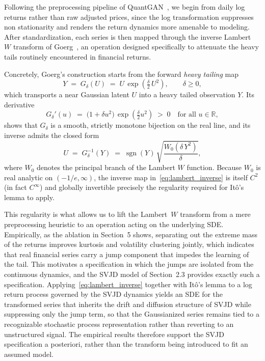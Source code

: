 \documentclass[sigconf,natbib=false]{acmart}
\begin{document}
Following the preprocessing pipeline of QuantGAN~\cite{QuantGAN}, we begin from daily log returns rather than raw adjusted prices, since the log transformation suppresses non stationarity and renders the return dynamics more amenable to modeling. After standardization, each series is then mapped through the inverse Lambert~$W$ transform of Goerg~\cite{goerg2015lambert}, an operation designed specifically to attenuate the heavy tails routinely encountered in financial returns.

Concretely, Goerg's construction starts from the forward \emph{heavy tailing} map
\begin{equation}
    Y \;=\; G_{\delta}(U) \;=\; U \, \exp\!\left( \tfrac{\delta}{2}\, U^{2} \right), \qquad \delta \geq 0,
    \label{eq:lambert_forward}
\end{equation}
which transports a near Gaussian latent $U$ into a heavy tailed observation $Y$. Its derivative
\begin{equation}
    G_{\delta}'(u) \;=\; \bigl(1 + \delta u^{2}\bigr)\, \exp\!\left( \tfrac{\delta}{2} u^{2} \right) \;>\; 0
    \quad \text{for all } u \in \mathbb{R},
\end{equation}
shows that $G_{\delta}$ is a smooth, strictly monotone bijection on the real line, and its inverse admits the closed form
\begin{equation}
    U \;=\; G_{\delta}^{-1}(Y) \;=\; \operatorname{sgn}(Y)\,\sqrt{\frac{W_{0}\!\left(\delta\,Y^{2}\right)}{\delta}},
    \label{eq:lambert_inverse}
\end{equation}
where $W_{0}$ denotes the principal branch of the Lambert $W$ function. Because $W_{0}$ is real analytic on $(-1/e, \infty)$, the inverse map in~\eqref{eq:lambert_inverse} is itself $C^{2}$ (in fact $C^{\infty}$) and globally invertible precisely the regularity required for It\^{o}'s lemma to apply.

This regularity is what allows us to lift the Lambert~$W$ transform from a mere preprocessing heuristic to an operation acting on the underlying SDE. Empirically, as the ablation in Section~5 shows, separating out the extreme mass of the returns improves kurtosis and volatility clustering jointly, which indicates that real financial series carry a jump component that impedes the learning of the tail. This motivates a specification in which the jumps are isolated from the continuous dynamics, and the SVJD model of Section~2.3 provides exactly such a specification. Applying~\eqref{eq:lambert_inverse} together with It\^{o}'s lemma to a log return process governed by the SVJD dynamics yields an SDE for the transformed series that inherits the drift and diffusion structure of SVJD while suppressing only the jump term, so that the Gaussianized series remains tied to a recognizable stochastic process representation rather than reverting to an unstructured signal. The empirical results therefore support the SVJD specification a posteriori, rather than the transform being introduced to fit an assumed model.
\end{document}
